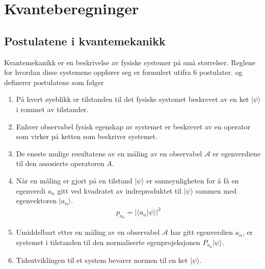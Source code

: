 \section{Kvanteberegninger}




    \subsection{Postulatene i kvantemekanikk}

        Kvantemekanikk er en beskrivelse av fysiske systemer på små størrelser. Reglene for hvordan disse systemene oppfører seg er formulert utifra 6 postulater. \cite{Jaffe_2007} og \cite{portugal_2019} definerer postulatene som følger
        \begin{enumerate}
            \item På hvert øyeblikk er tilstanden til det fysiske systemet beskrevet av en ket $|\psi\rangle$ i rommet av tilstander.
            \item Enhver observabel fysisk egenskap av systemet er beskrevet av en operator som virker på ketten som beskriver systemet.
            \item De eneste mulige resultatene av en måling av en observabel $\mathcal{A}$ er egenverdiene til den assosierte operatoren $A$.
            \item Når en måling er gjort på en tilstand $|\psi\rangle$ er sannsynligheten for å få en egenverdi $a_n$ gitt ved kvadratet av indreproduktet til $|\psi\rangle$ sammen med egenvektoren $|a_n\rangle$.
            \begin{align*}
                p_{a_n} = |\langle a_n|\psi\rangle|^2
            \end{align*}
            \item Umiddelbart etter en måling av en observabel $\mathcal{A}$ har gitt egenverdien $a_n$, er systemet i tilstanden til den normaliserte egenprojeksjonen $P_{a_n}|\psi\rangle$.
            \item Tidsutviklingen til et system bevarer normen til en ket $|\psi\rangle$.
        \end{enumerate}

